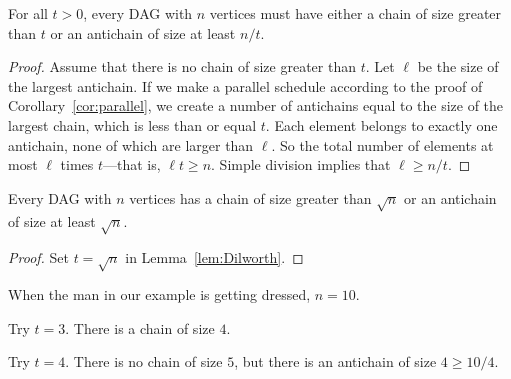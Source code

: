 \begin{lemma}[Dilworth]\label{lem:Dilworth}
For all $t>0$, every DAG with $n$ vertices must have either a chain of
size greater than $t$ or an antichain of size at least $n / t$.
\end{lemma}

\begin{proof}
Assume that there is no chain of size greater than $t$.  Let $\ell$ be
the size of the largest antichain.  If we make a parallel schedule
according to the proof of Corollary~\ref{cor:parallel}, we create a
number of antichains equal to the size of the largest chain, which is
less than or equal $t$.  Each element belongs to exactly one
antichain, none of which are larger than $\ell$.  So the total number
of elements at most $\ell$ times $t$---that is, $\ell t \geq n$.
Simple division implies that $\ell \geq n/t$.
\end{proof}

\begin{corollary}\label{cor:Dilworth}
Every DAG with $n$ vertices has a chain of size greater
than $\sqrt{n}$ or an antichain of size at least $\sqrt{n}$.

\begin{proof}
  Set $t = \sqrt{n}$ in Lemma~\ref{lem:Dilworth}.
\end{proof}
\end{corollary}

\begin{example}
When the man in our example is getting dressed, $n = 10$.

Try $t = 3$.  There is a chain of size $4$.

Try $t = 4$.  There is no chain of size $5$, but there is an antichain of
size $4 \geq 10 / 4$.
\end{example}

\begin{problems}
\practiceproblems
{}
{}

\classproblems
{}

\homeworkproblems
{}

\end{problems}

